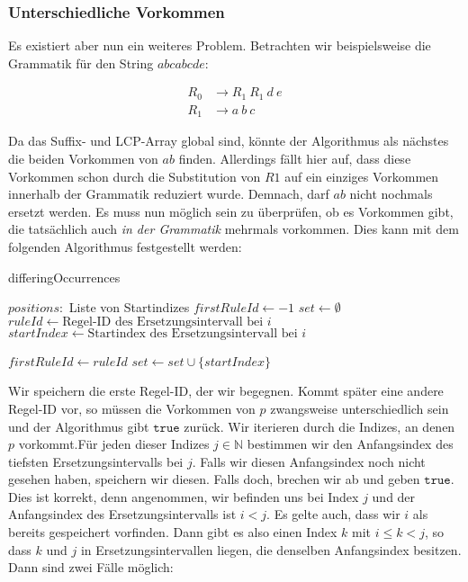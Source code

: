 \subsubsection{Unterschiedliche Vorkommen}

Es existiert aber nun ein weiteres Problem. Betrachten wir beispielsweise die Grammatik für den String $abcabcde$:

\begin{align*}
	R_0 &\rightarrow R_1\ R_1\ d\ e\\
	R_1 &\rightarrow a\ b\ c
\end{align*}

Da das Suffix- und LCP-Array global sind, könnte der Algorithmus als nächstes die beiden Vorkommen von $ab$ finden. 
Allerdings fällt hier auf, dass diese Vorkommen schon durch die Substitution von $R1$ auf ein einziges Vorkommen innerhalb der Grammatik reduziert wurde. Demnach, darf $ab$ nicht nochmals ersetzt werden. 
Es muss nun möglich sein zu überprüfen, ob es Vorkommen gibt, die tatsächlich auch \textit{in der Grammatik} mehrmals vorkommen.
Dies kann mit dem folgenden Algorithmus festgestellt werden:

\begin{algorithm}
	\caption{differingOccurrences}
	\begin{algorithmic}
		\REQUIRE $positions:$ Liste von Startindizes
		\STATE $firstRuleId \leftarrow -1$
		\STATE $set \leftarrow \emptyset$
			\STATE $ruleId \leftarrow \text{Regel-ID des Ersetzungsintervall bei } i$
			\STATE $startIndex \leftarrow \text{Startindex des Ersetzungsintervall bei } i$
			
				\STATE $firstRuleId \leftarrow ruleId$
				\RETURN \TRUE
			\ENDIF
			\STATE $set \leftarrow set \cup \{startIndex\}$
		\ENDFOR
		\RETURN \FALSE
	\end{algorithmic}
\end{algorithm}

Wir speichern die erste Regel-ID, der wir begegnen. Kommt später eine andere Regel-ID vor, so müssen die Vorkommen von $p$ zwangsweise unterschiedlich sein und der Algorithmus gibt $\texttt{true}$ zurück.
Wir iterieren durch die Indizes, an denen $p$ vorkommt.Für jeden dieser Indizes $j \in \mathbb{N}$ bestimmen wir den Anfangsindex des tiefsten Ersetzungsintervalls bei $j$. 
Falls wir diesen Anfangsindex noch nicht gesehen haben, speichern wir diesen. Falls doch, brechen wir ab und geben $\texttt{true}$. 
Dies ist korrekt, denn angenommen, wir befinden uns bei Index $j$ und der Anfangsindex des Ersetzungsintervalls ist $i < j$. Es gelte auch, dass wir $i$ als bereits gespeichert vorfinden. Dann gibt es also einen Index $k$ mit $i \leq k < j$, so dass $k$ und $j$ in Ersetzungsintervallen liegen, die denselben Anfangsindex besitzen. Dann sind zwei Fälle möglich:

